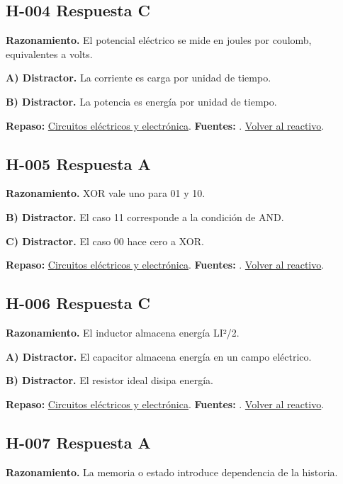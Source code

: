 \subsection*{H-004 \quad Respuesta C}\label{s:H-004}
\textbf{Razonamiento.} El potencial eléctrico se mide en joules por coulomb, equivalentes a volts.

\textbf{A) Distractor. }La corriente es carga por unidad de tiempo.

\textbf{B) Distractor. }La potencia es energía por unidad de tiempo.

\textbf{Repaso:} \hyperref[sec:h1]{Circuitos eléctricos y electrónica}. \textbf{Fuentes:} \cite{openstax,electronics,digital}. \hyperref[q:H-004]{Volver al reactivo}.\par\medskip

\subsection*{H-005 \quad Respuesta A}\label{s:H-005}
\textbf{Razonamiento.} XOR vale uno para 01 y 10.

\textbf{B) Distractor. }El caso 11 corresponde a la condición de AND.

\textbf{C) Distractor. }El caso 00 hace cero a XOR.

\textbf{Repaso:} \hyperref[sec:h1]{Circuitos eléctricos y electrónica}. \textbf{Fuentes:} \cite{openstax,electronics,digital}. \hyperref[q:H-005]{Volver al reactivo}.\par\medskip

\subsection*{H-006 \quad Respuesta C}\label{s:H-006}
\textbf{Razonamiento.} El inductor almacena energía LI²/2.

\textbf{A) Distractor. }El capacitor almacena energía en un campo eléctrico.

\textbf{B) Distractor. }El resistor ideal disipa energía.

\textbf{Repaso:} \hyperref[sec:h1]{Circuitos eléctricos y electrónica}. \textbf{Fuentes:} \cite{openstax,electronics,digital}. \hyperref[q:H-006]{Volver al reactivo}.\par\medskip

\subsection*{H-007 \quad Respuesta A}\label{s:H-007}
\textbf{Razonamiento.} La memoria o estado introduce dependencia de la historia.

